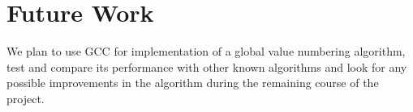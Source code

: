 \chapter{Future Work}

We plan to use GCC for implementation of a global value numbering algorithm, test and compare its performance with other known algorithms and look for any possible improvements in the algorithm during the remaining course of the project.
